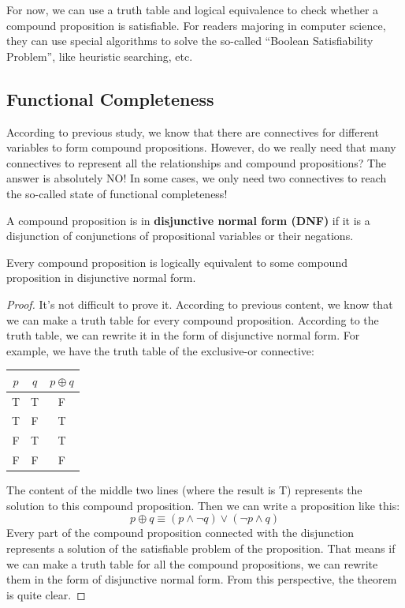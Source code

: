 For now, we can use a truth table and logical equivalence to check whether a compound proposition is satisfiable. For readers majoring in computer science, they can use special algorithms to solve the so-called “Boolean Satisfiability Problem”, like heuristic searching, etc.

\subsection{Functional Completeness}
According to previous study, we know that there are connectives for different variables to form compound propositions. However, do we really need that many connectives to represent all the relationships and compound propositions? The answer is absolutely NO! In some cases, we only need two connectives to reach the so-called state of functional completeness!

\begin{definition}
A compound proposition is in \textbf{disjunctive normal form (DNF)} if it is a disjunction of conjunctions of propositional variables or their negations.
\end{definition}

\begin{theorem}
Every compound proposition is logically equivalent to some compound proposition in disjunctive normal form.
\end{theorem}
\begin{proof}
It's not difficult to prove it. According to previous content, we know that we can make a truth table for every compound proposition. According to the truth table, we can rewrite it in the form of disjunctive normal form. For example, we have the truth table of the exclusive-or connective:
\begin{center}
\begin{tabular}{cc|c}
\toprule
$p$ & $q$ & $p \oplus q$ \\
\midrule
T & T & F \\
T & F & T \\
F & T & T \\
F & F & F \\
\bottomrule
\end{tabular}
\end{center}
The content of the middle two lines (where the result is T) represents the solution to this compound proposition. Then we can write a proposition like this:
$$ p \oplus q \equiv (p \wedge \neg q) \vee (\neg p \wedge q) $$
Every part of the compound proposition connected with the disjunction represents a solution of the satisfiable problem of the proposition. That means if we can make a truth table for all the compound propositions, we can rewrite them in the form of disjunctive normal form. From this perspective, the theorem is quite clear.
\end{proof}

